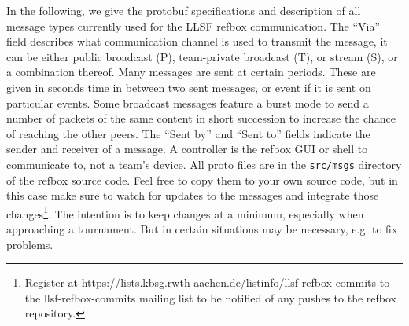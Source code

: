 \documentclass[a4paper]{article}
\begin{document}
In the following, we give the protobuf specifications and description
of all message types currently used for the LLSF refbox
communication. The ``Via'' field describes what communication channel
is used to transmit the message, it can be either public broadcast
(P), team-private broadcast (T), or stream (S), or a combination
thereof. Many messages are sent at certain periods. These are given in
seconds time in between two sent messages, or event if it is sent on
particular events. Some broadcast messages feature a burst mode to
send a number of packets of the same content in short succession to
increase the chance of reaching the other peers. The ``Sent by'' and
``Sent to'' fields indicate the sender and receiver of a message. A
controller is the refbox GUI or shell to communicate to, not a team's
device. All proto files are in the \texttt{src/msgs} directory of the
refbox source code. Feel free to copy them to your own source code,
but in this case make sure to watch for updates to the messages and
integrate those changes\footnote{Register at
  \url{https://lists.kbsg.rwth-aachen.de/listinfo/llsf-refbox-commits}
  to the llsf-refbox-commits mailing list to be notified of any pushes
  to the refbox repository.}. The intention is to keep changes at a
minimum, especially when approaching a tournament. But in certain
situations may be necessary, e.g. to fix problems.

\bigskip

\newcommand{\msgspec}[6]{%
\hspace{-1.1\parindent}
\begin{minipage}{\linewidth}
  \begin{minipage}[t]{.48\linewidth}
    \vspace{0pt}
    
      {../../src/msgs/#1}
  \end{minipage}
  \hspace{.01\linewidth}
  \begin{minipage}[t]{.51\linewidth}
    \vspace{2pt}
    \small
    \begin{tabular}{>{\bfseries}ll>{\bfseries}ll}
      File:&\multicolumn{3}{p{.95\linewidth}}{%
        \texttt{#1}
      }\\[3pt]
      Groups:&#2&Period:&#3\\
      Sent by:&#4&Sent to:&#5\\[3pt]
      \multicolumn{4}{p{.95\linewidth}}{%
        #6
      }
    \end{tabular}
  \end{minipage}
\end{minipage}
}
\end{document}
